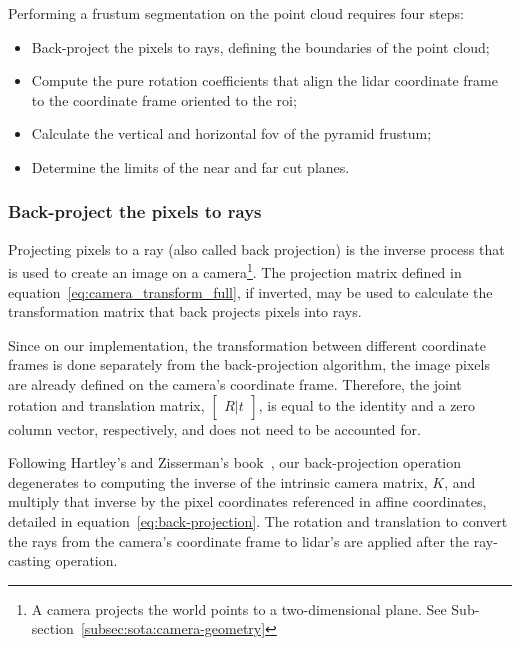 Performing a frustum segmentation on the point cloud requires four steps:

\begin{itemize}
	\item Back-project the pixels to rays, defining the boundaries of the point cloud;
	\item Compute the pure rotation coefficients that align the \ac{lidar} coordinate frame to the coordinate frame oriented to the \ac{roi};
	\item Calculate the vertical and horizontal \acf{fov} of the pyramid frustum;
	\item Determine the limits of the near and far cut planes.
\end{itemize}

\subsubsection{Back-project the pixels to rays}
Projecting pixels to a ray (also called back projection) is the inverse process that is used to create an image on a camera\footnote{A camera projects the world points to a two-dimensional plane. See Sub-section~\ref{subsec:sota:camera-geometry}}. The projection matrix defined in equation~\eqref{eq:camera_transform_full}, if inverted, may be used to calculate the transformation matrix that  back projects pixels into rays.

Since on our implementation, the transformation between different coordinate frames is done separately from the back-projection algorithm, the image pixels are already defined on the camera's coordinate frame. Therefore, the joint rotation and translation matrix, $\begin{bmatrix} R|t \end{bmatrix}$, is equal to the identity and a zero column vector, respectively, and does not need to be accounted for.

Following Hartley's and Zisserman's book~\cite{mvg_book}, our back-projection operation degenerates to computing the inverse of the intrinsic camera matrix, $K$, and multiply that inverse by the pixel coordinates referenced in affine coordinates, detailed in equation~\eqref{eq:back-projection}. The rotation and translation to convert the rays from the camera's coordinate frame to \ac{lidar}'s are applied after the ray-casting operation.

